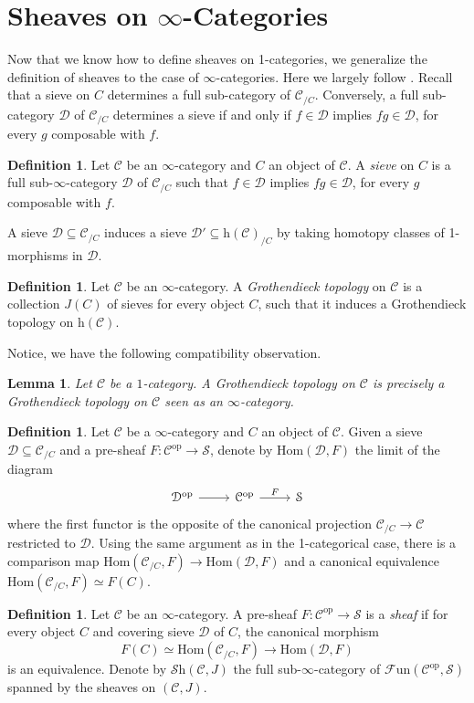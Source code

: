 \documentclass[a4paper]{book}
\newcommand{\lC}{\mathcal{C}}
\newcommand{\lD}{\mathcal{D}}
\newcommand{\lF}{\mathcal{F}}
\newcommand{\lS}{\mathcal{S}}
\newcommand{\op}{\mathrm{op}}
\newcommand{\Fun}{\lF\mathrm{un}} %
\newcommand{\Shv}{\lS\mathrm{h}} %
\newcommand{\Ho}{\mathrm{h}} %
\renewcommand{\hom}{\mathrm{Hom}} %
\newtheorem{lemma}[equation]{Lemma}
\theoremstyle{definition}
\newtheorem{definition}[equation]{Definition}
\theoremstyle{remark}
\numberwithin{equation}{section}
\begin{document}
	\section{Sheaves on \texorpdfstring{$\infty$}{oo}-Categories}
	Now that we know how  to define sheaves on 1-categories, we generalize the definition of sheaves to the case of $\infty$-categories. Here we largely follow \cite{lurie2009htt}. Recall that a sieve on $C$ determines a full sub-category of $\lC_{/C}$. Conversely, a full sub-category $\lD$ of $\lC_{/C}$ determines a sieve if and only if $f\in\lD$ implies $fg\in\lD$, for every $g$ composable with $f$. 
	\begin{definition}
		Let $\lC$ be an $\infty$-category and $C$ an object of $\lC$. A \textit{sieve} on $C$ is a full sub-$\infty$-category $\lD$ of $\lC_{/C}$ such that $f\in\lD$ implies $fg\in\lD$, for every $g$ composable with $f$.  
	\end{definition}
	A sieve $\lD\subseteq\lC_{/C}$ induces a sieve $\lD'\subseteq\Ho(\lC)_{/C}$ by taking homotopy classes of 1-morphisms in $\lD$. 
	\begin{definition}
		Let $\lC$ be an $\infty$-category. A \emph{Grothendieck topology} on $\lC$ is a collection $J(C)$ of sieves for every object $C$, such that it induces a Grothendieck topology on $\Ho(\lC)$. 
	\end{definition}
	
	Notice, we have the following compatibility observation.
	\begin{lemma}
		Let $\lC$ be a $1$-category. A Grothendieck topology on $\lC$ is precisely a Grothendieck topology on $\lC$ seen as an $\infty$-category.
	\end{lemma}
	\begin{definition}
		Let $\lC$ be a $\infty$-category and $C$ an object of $\lC$. Given a sieve $\lD\subseteq\lC_{/C}$ and a pre-sheaf $F:\lC^{\op}\to\lS$, denote by $\hom(\lD,F)$ the limit of the diagram \begin{equation}
		\begin{tikzcd}
			\lD^{\op}\arrow[r] & \lC^{\op}\arrow[r,"F"] & \lS
		\end{tikzcd}
	\end{equation}where the first functor is the opposite of the canonical projection $\lC_{/C}\to\lC$ restricted to $\lD$. Using the same argument as in the 1-categorical case, there is a comparison map $\hom(\lC_{/C},F)\to\hom(\lD,F)$ and a canonical equivalence $\hom(\lC_{/C},F)\simeq F(C)$. 
	\end{definition}
	\begin{definition}
		Let $\lC$ be an $\infty$-category. A pre-sheaf $F\colon\lC^{\op}\to\lS$ is a \emph{sheaf} if for every object $C$ and covering sieve $\lD$ of $C$, the canonical morphism
		\[ F(C)\simeq\hom(\lC_{/C},F) \to \hom(\lD,F) \]
		is an equivalence. Denote by $\Shv(\lC,J)$ the full sub-$\infty$-category of $\Fun(\lC^{\op},\lS)$ spanned by the sheaves on $(\lC,J)$.
	\end{definition}
	
\end{document}
